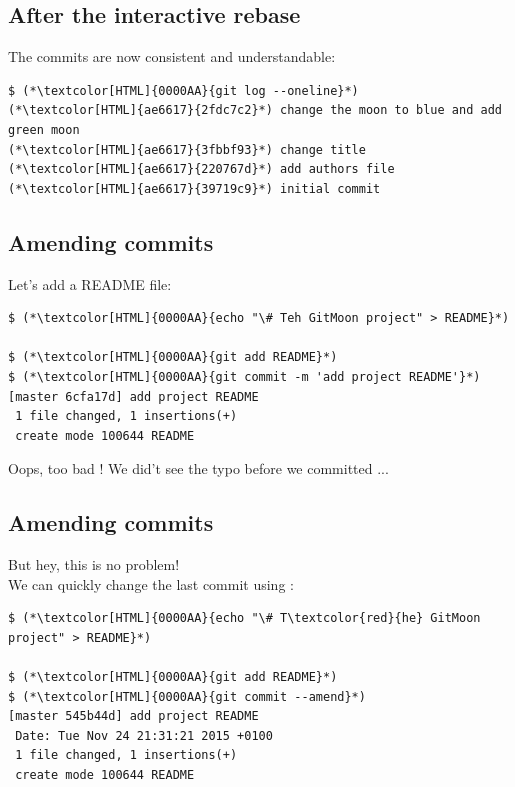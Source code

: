 \subsection{After the interactive rebase}
\begin{frame}[fragile]
  \subslidetitle

  The commits are now consistent and understandable:
  \begin{lstlisting}
$ (*\textcolor[HTML]{0000AA}{git log --oneline}*)
(*\textcolor[HTML]{ae6617}{2fdc7c2}*) change the moon to blue and add green moon
(*\textcolor[HTML]{ae6617}{3fbbf93}*) change title
(*\textcolor[HTML]{ae6617}{220767d}*) add authors file
(*\textcolor[HTML]{ae6617}{39719c9}*) initial commit
\end{lstlisting}

\end{frame}


\subsection{Amending commits}
\begin{frame}[fragile]
  \subslidetitle

  Let's add a README file:

  \begin{lstlisting}
$ (*\textcolor[HTML]{0000AA}{echo "\# Teh GitMoon project" > README}*)

$ (*\textcolor[HTML]{0000AA}{git add README}*)
$ (*\textcolor[HTML]{0000AA}{git commit -m 'add project README'}*)
[master 6cfa17d] add project README
 1 file changed, 1 insertions(+)
 create mode 100644 README
\end{lstlisting}

  \vspace{1em}
  Oops, too bad ! We did't see the typo before we committed ...
\end{frame}


\subsection{Amending commits}
\begin{frame}[fragile]
  \subslidetitle

  But hey, this is no problem!\\
  \vspace{1em}
  We can quickly change the last commit using :

  \begin{lstlisting}
$ (*\textcolor[HTML]{0000AA}{echo "\# T\textcolor{red}{he} GitMoon project" > README}*)

$ (*\textcolor[HTML]{0000AA}{git add README}*)
$ (*\textcolor[HTML]{0000AA}{git commit --amend}*)
[master 545b44d] add project README
 Date: Tue Nov 24 21:31:21 2015 +0100
 1 file changed, 1 insertions(+)
 create mode 100644 README
\end{lstlisting}

\end{frame}

